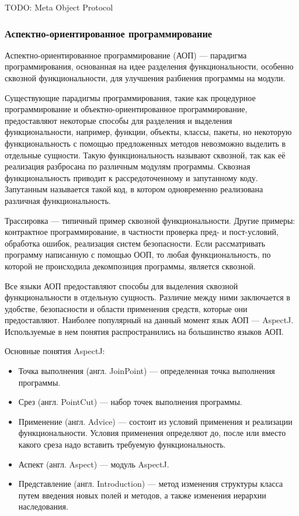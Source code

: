 \documentclass[a4paper,12pt]{article}
\begin{document}
TODO: Meta Object Protocol

\subsubsection{Аспектно-ориентированное программирование}
Аспектно-ориентированное программирование (АОП) — парадигма программирования,
основанная на идее разделения функциональности, особенно сквозной
функциональности, для улучшения разбиения программы на модули.

Существующие парадигмы программирования, такие как процедурное программирование
и объектно-ориентированное программирование, предоставляют некоторые способы
для разделения и выделения функциональности, например, функции, объекты,
классы, пакеты, но некоторую функциональность с помощью предложенных методов
невозможно выделить в отдельные сущности. Такую функциональность называют
сквозной, так как её реализация разбросана по различным модулям программы.
Сквозная функциональность приводит к рассредоточенному и запутанному коду.
Запутанным называется такой код, в котором одновременно реализована различная
функциональность.

Трассировка — типичный пример сквозной функциональности. Другие примеры:
контрактное программирование, в частности проверка пред- и пост-условий,
обработка ошибок, реализация систем безопасности. Если рассматривать программу
написанную с помощью ООП, то любая функциональность, по которой не происходила
декомпозиция программы, является сквозной.

Все языки АОП предоставляют способы для выделения сквозной функциональности в
отдельную сущность. Различие между ними заключается в удобстве, безопасности и
области применения средств, которые они предоставляют. Наиболее популярный на
данный момент язык АОП — AspectJ. Используемые в нем понятия распространились
на большинство языков АОП.

Основные понятия AspectJ:
\begin{itemize}
 \item Точка выполнения (англ. JoinPoint) — определенная точка выполнения программы.
 \item Срез (англ. PointCut) — набор точек выполнения программы.
 \item Применение (англ. Advice) — состоит из условий применения и реализации
 функциональности. Условия применения определяют до, после или вместо какого
 среза надо вставить требуемую функциональность.  
 \item Аспект (англ. Aspect) — модуль AspectJ.
 \item Представление (англ. Introduction) — метод изменения структуры класса
 путем введения новых полей и методов, а также изменения иерархии наследования.
\end{itemize}
\end{document}

